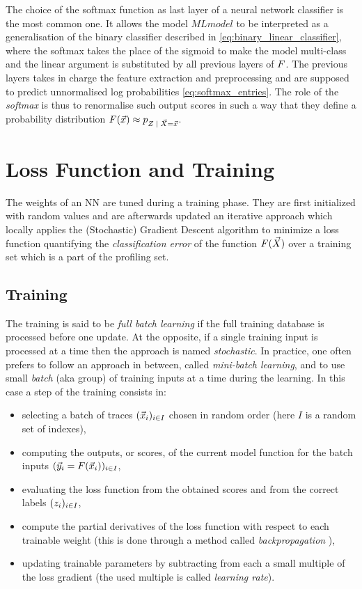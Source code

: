The choice of the softmax function as last layer of a neural network classifier is the most common one. It allows the model $MLmodel$ to be interpreted as a generalisation of the binary classifier described in \eqref{eq:binary_linear_classifier}, where the softmax takes the place of the sigmoid to make the model multi-class and the linear argument is substituted by all previous layers of $F$. The previous layers takes in charge the feature extraction and preprocessing and are supposed to predict unnormalised log probabilities \eqref{eq:softmax_entries}. The role of the \emph{softmax} is thus to renormalise such output scores in such a way that they define a probability distribution $\MLmodel(\vLeakVec) \approx \pdf_{\given{\sensRandVar}{\vaLeakVec=\vLeakVec}}$. 

\section{Loss Function and Training}
The weights of an NN are tuned during a training phase. They are first initialized with random values and are afterwards updated  \via an
iterative approach which locally applies the (Stochastic) Gradient Descent
algorithm \cite{Goodfellow-et-al-2016} to minimize a loss function
quantifying the \emph{classification error} of the function
$F(\vec{X})$ over a training set which is a part of the profiling set. 


\subsection{Training}
The training is said to be \emph{full batch learning} if
the full training database is processed before one update. At the opposite, if
a single training input is processed at a time then the approach is named
\emph{stochastic}. In practice, one often prefers to follow an approach in
between, called \emph{mini-batch learning}, and to use small \emph{batch} (aka
group) of training inputs at a time during the learning. In this case a step of the training consists in: 
\begin{itemize}
\item selecting a batch of traces $(\vec{x}_i)_{i\in I}$ chosen in random order (here $I$ is a random set of indexes),
\item computing the outputs, or scores, of the current model function for the batch inputs $(\vec{y}_i = F(\vec{x}_i))_{i\in I}$, 
\item evaluating the loss function from the obtained scores and from the correct labels $(z_i)_{i\in I}$,
\item compute the partial derivatives of the loss function with respect to each trainable weight (this is done through a method called \emph{backpropagation} \cite{LeCun2012}),
\item updating trainable parameters by subtracting from each a small multiple of the loss gradient (the used multiple is called \emph{learning rate}).
\end{itemize}  

